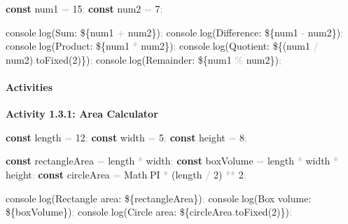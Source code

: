 \documentclass[
  justified,
  openright,
]{tufte-book}
\let\subsection\paragraph
\let\paragraph\paragraph
\newcommand{\KeywordTok}[1]{\textcolor{CodeKeyword}{\textbf{#1}}}  %
\newcommand{\StringTok}[1]{\textcolor{CodeString}{#1}}              %
\newcommand{\CodeNumTok}[1]{\textcolor{CodeNumber}{#1}}             %
\newcommand{\CodeFuncTok}[1]{\textcolor{CodeKeyword}{#1}}           %
\newcommand{\OperatorTok}[1]{\textcolor{DarkGray}{#1}}              %
\newenvironment{Shaded}{%
  \begin{mdframed}[style=TufteCode]%
}{%
  \end{mdframed}%
}
\let\subsection\paragraph
\let\paragraph\paragraph
\begin{document}
\begin{Shaded}
\begin{Highlighting}[]
\KeywordTok{const} num1 \OperatorTok{=} \CodeNumTok{15}\OperatorTok{;}
\KeywordTok{const} num2 \OperatorTok{=} \CodeNumTok{7}\OperatorTok{;}
 
console\OperatorTok{.}\CodeFuncTok{log}(\StringTok{\textasciigrave{}Sum: }\StringTok{\$\{}num1 \OperatorTok{+} num2\StringTok{\}}\StringTok{\textasciigrave{}})\OperatorTok{;}
console\OperatorTok{.}\CodeFuncTok{log}(\StringTok{\textasciigrave{}Difference: }\StringTok{\$\{}num1 \OperatorTok{{-}} num2\StringTok{\}}\StringTok{\textasciigrave{}})\OperatorTok{;}
console\OperatorTok{.}\CodeFuncTok{log}(\StringTok{\textasciigrave{}Product: }\StringTok{\$\{}num1 \OperatorTok{*} num2\StringTok{\}}\StringTok{\textasciigrave{}})\OperatorTok{;}
console\OperatorTok{.}\CodeFuncTok{log}(\StringTok{\textasciigrave{}Quotient: }\StringTok{\$\{}(num1 \OperatorTok{/} num2)\OperatorTok{.}\CodeFuncTok{toFixed}(\CodeNumTok{2})\StringTok{\}}\StringTok{\textasciigrave{}})\OperatorTok{;}
console\OperatorTok{.}\CodeFuncTok{log}(\StringTok{\textasciigrave{}Remainder: }\StringTok{\$\{}num1 \OperatorTok{\%} num2\StringTok{\}}\StringTok{\textasciigrave{}})\OperatorTok{;}
\end{Highlighting}
\end{Shaded}

\subsection{Activities}\label{activities-12}

\textbf{Activity 1.3.1: Area Calculator}

\begin{Shaded}
\begin{Highlighting}[]
\KeywordTok{const} length \OperatorTok{=} \CodeNumTok{12}\OperatorTok{;}
\KeywordTok{const} width \OperatorTok{=} \CodeNumTok{5}\OperatorTok{;}
\KeywordTok{const} height \OperatorTok{=} \CodeNumTok{8}\OperatorTok{;}
 
\KeywordTok{const} rectangleArea \OperatorTok{=} length \OperatorTok{*} width\OperatorTok{;}
\KeywordTok{const} boxVolume \OperatorTok{=} length \OperatorTok{*} width \OperatorTok{*} height\OperatorTok{;}
\KeywordTok{const} circleArea \OperatorTok{=} Math\OperatorTok{.}\CodeNumTok{PI} \OperatorTok{*} (length \OperatorTok{/} \CodeNumTok{2}) \OperatorTok{**} \CodeNumTok{2}\OperatorTok{;}
 
console\OperatorTok{.}\CodeFuncTok{log}(\StringTok{\textasciigrave{}Rectangle area: }\StringTok{\$\{}rectangleArea\StringTok{\}}\StringTok{\textasciigrave{}})\OperatorTok{;}
console\OperatorTok{.}\CodeFuncTok{log}(\StringTok{\textasciigrave{}Box volume: }\StringTok{\$\{}boxVolume\StringTok{\}}\StringTok{\textasciigrave{}})\OperatorTok{;}
console\OperatorTok{.}\CodeFuncTok{log}(\StringTok{\textasciigrave{}Circle area: }\StringTok{\$\{}circleArea\OperatorTok{.}\CodeFuncTok{toFixed}(\CodeNumTok{2})\StringTok{\}}\StringTok{\textasciigrave{}})\OperatorTok{;}
\end{Highlighting}
\end{Shaded}
\end{document}
